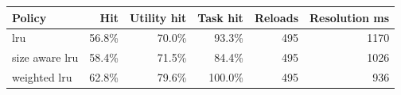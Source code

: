 \begin{tabular}{lrrrrr}
\toprule
Policy & Hit & Utility hit & Task hit & Reloads & Resolution ms \\
\midrule
lru & 56.8\% & 70.0\% & 93.3\% & 495 & 1170 \\
size aware lru & 58.4\% & 71.5\% & 84.4\% & 495 & 1026 \\
weighted lru & 62.8\% & 79.6\% & 100.0\% & 495 & 936 \\
\bottomrule
\end{tabular}
